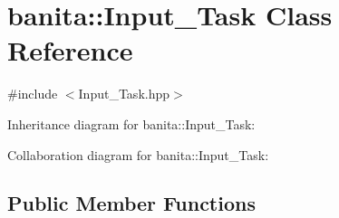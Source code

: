 \hypertarget{classbanita_1_1_input___task}{}\section{banita\+::Input\+\_\+\+Task Class Reference}
\label{classbanita_1_1_input___task}


{\ttfamily \#include $<$Input\+\_\+\+Task.\+hpp$>$}



Inheritance diagram for banita\+::Input\+\_\+\+Task\+:


Collaboration diagram for banita\+::Input\+\_\+\+Task\+:
\subsection*{Public Member Functions}
